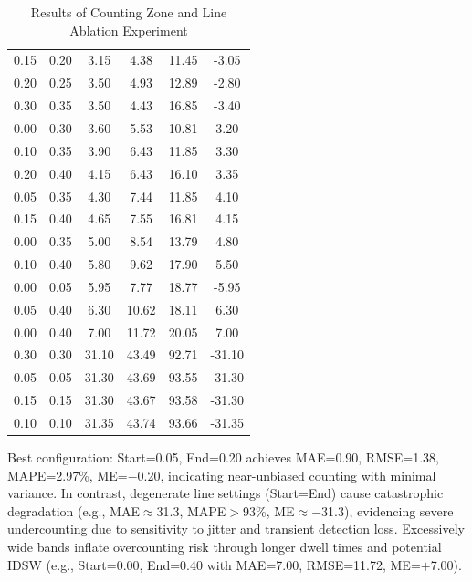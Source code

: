 \begin{table}[H]
{\begin{tabular}{cccccc}
        \rowcolor{gray!10}
        0.15  & 0.20  & 3.15  & 4.38  & 11.45  & -3.05   \\
        0.20  & 0.25  & 3.50  & 4.93  & 12.89  & -2.80   \\
        \rowcolor{gray!10}
        0.30  & 0.35  & 3.50  & 4.43  & 16.85  & -3.40   \\
        0.00  & 0.30  & 3.60  & 5.53  & 10.81  & 3.20   \\
        \rowcolor{gray!10}
        0.10  & 0.35  & 3.90  & 6.43  & 11.85  & 3.30   \\
        0.20  & 0.40  & 4.15  & 6.43  & 16.10  & 3.35   \\
        \rowcolor{gray!10}
        0.05  & 0.35  & 4.30  & 7.44  & 11.85  & 4.10   \\
        0.15  & 0.40  & 4.65  & 7.55  & 16.81  & 4.15   \\
        \rowcolor{gray!10}
        0.00  & 0.35  & 5.00  & 8.54  & 13.79  & 4.80   \\
        0.10  & 0.40  & 5.80  & 9.62  & 17.90  & 5.50   \\
        \rowcolor{gray!10}
        0.00  & 0.05  & 5.95  & 7.77  & 18.77  & -5.95   \\
        0.05  & 0.40  & 6.30  & 10.62  & 18.11  & 6.30   \\
        \rowcolor{gray!10}
        0.00  & 0.40  & 7.00  & 11.72  & 20.05  & 7.00   \\
        0.30  & 0.30  & 31.10  & 43.49  & 92.71  & -31.10   \\
        \rowcolor{gray!10}
        0.05  & 0.05  & 31.30  & 43.69  & 93.55  & -31.30   \\
        0.15  & 0.15  & 31.30  & 43.67  & 93.58  & -31.30   \\
        \rowcolor{gray!10}
        0.10  & 0.10  & 31.35  & 43.74  & 93.66  & -31.35   \\ \midrule
    \end{tabular}%
    }
    \caption{Results of Counting Zone and Line Ablation Experiment}
    \label{tab:Cba3}
\end{table}

Best configuration: Start=0.05, End=0.20 achieves MAE=0.90, RMSE=1.38, MAPE=2.97\%, ME=$-$0.20, indicating near-unbiased counting with minimal variance. In contrast, degenerate line settings (Start=End) cause catastrophic degradation (e.g., MAE$\approx$31.3, MAPE$>$93\%, ME$\approx$$-$31.3), evidencing severe undercounting due to sensitivity to jitter and transient detection loss. Excessively wide bands inflate overcounting risk through longer dwell times and potential IDSW (e.g., Start=0.00, End=0.40 with MAE=7.00, RMSE=11.72, ME=$+$7.00).

